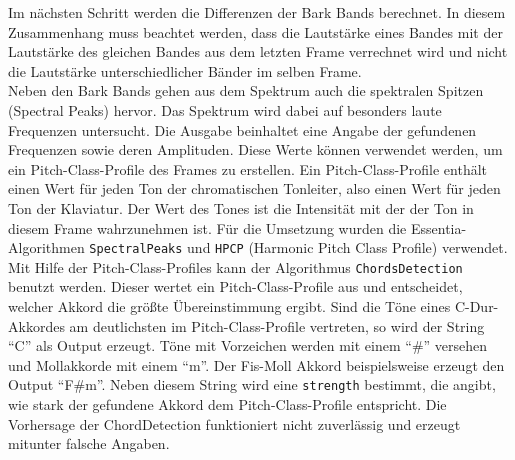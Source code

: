 \documentclass[11pt,a4paper]{article}
\begin{document}
Im nächsten Schritt werden die Differenzen der Bark Bands berechnet. In diesem Zusammenhang muss beachtet werden, dass die Lautstärke eines Bandes mit der Lautstärke des gleichen Bandes aus dem letzten Frame verrechnet wird und nicht die Lautstärke unterschiedlicher Bänder im selben Frame.\\
Neben den Bark Bands gehen aus dem Spektrum auch die spektralen Spitzen (Spectral Peaks) hervor. Das Spektrum wird dabei auf besonders laute Frequenzen untersucht. Die Ausgabe beinhaltet eine Angabe der gefundenen Frequenzen sowie deren Amplituden. Diese Werte können verwendet werden, um ein Pitch-Class-Profile des Frames zu erstellen. Ein Pitch-Class-Profile enthält einen Wert für jeden Ton der chromatischen Tonleiter, also einen Wert für jeden Ton der Klaviatur. Der Wert des Tones ist die Intensität mit der der Ton in diesem Frame wahrzunehmen ist. Für die Umsetzung wurden die Essentia-Algorithmen \lstinline!SpectralPeaks! und \lstinline!HPCP! (Harmonic Pitch Class Profile) verwendet.\\
Mit Hilfe der Pitch-Class-Profiles kann der Algorithmus \lstinline!ChordsDetection! benutzt werden. Dieser wertet ein Pitch-Class-Profile aus und entscheidet, welcher Akkord die größte Übereinstimmung ergibt. Sind die Töne eines C-Dur-Akkordes am deutlichsten im Pitch-Class-Profile vertreten, so wird der String ``C'' als Output erzeugt. Töne mit Vorzeichen werden mit einem ``\#'' versehen und Mollakkorde mit einem ``m''. Der Fis-Moll Akkord beispielsweise erzeugt den Output ``F\#m''. Neben diesem String wird eine \lstinline!strength! bestimmt, die angibt, wie stark der gefundene Akkord dem Pitch-Class-Profile entspricht. Die Vorhersage der ChordDetection funktioniert nicht zuverlässig und erzeugt mitunter falsche Angaben.
\end{document}
